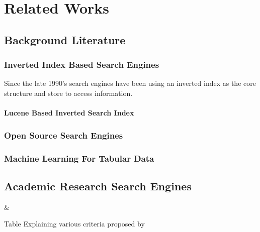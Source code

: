 \chapter{Related Works}
\label{relatedwork}

\section{Background Literature}
\label{relatedwork:background}

\subsection{Inverted Index Based Search Engines}
Since the late 1990's search engines have been using an inverted index as the core structure and store to access information. 

\subsubsection{Lucene Based Inverted Search Index}

\subsection{Open Source Search Engines}

\subsection{Machine Learning For Tabular Data}

\section{Academic Research Search Engines}

\begin{table*}[h]
    \label{table\arabic{tablecounter}}
            {\Criteria & \Meaning}
            \centering
            \caption{\label{tablecounter}Table Explaining various criteria proposed by \cite{gusenbauer2020academic}}
\end{table*}

